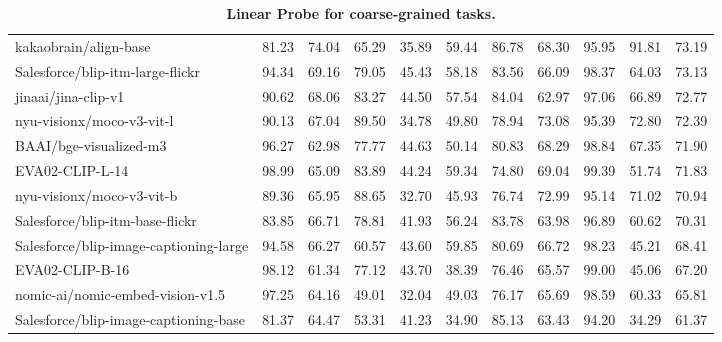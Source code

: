 \begin{table*}
{\begin{tabular}{lcccccccccc}
kakaobrain/align-base &81.23 &74.04 &65.29 &35.89 &59.44 &86.78 &68.30 &95.95 &91.81 &73.19 \\
Salesforce/blip-itm-large-flickr &94.34 &69.16 &79.05 &45.43 &58.18 &83.56 &66.09 &98.37 &64.03 &73.13 \\
jinaai/jina-clip-v1 &90.62 &68.06 &83.27 &44.50 &57.54 &84.04 &62.97 &97.06 &66.89 &72.77 \\
nyu-visionx/moco-v3-vit-l &90.13 &67.04 &89.50 &34.78 &49.80 &78.94 &73.08 &95.39 &72.80 &72.39 \\
BAAI/bge-visualized-m3 &96.27 &62.98 &77.77 &44.63 &50.14 &80.83 &68.29 &98.84 &67.35 &71.90 \\
EVA02-CLIP-L-14 &98.99 &65.09 &83.89 &44.24 &59.34 &74.80 &69.04 &99.39 &51.74 &71.83 \\
nyu-visionx/moco-v3-vit-b &89.36 &65.95 &88.65 &32.70 &45.93 &76.74 &72.99 &95.14 &71.02 &70.94 \\
Salesforce/blip-itm-base-flickr &83.85 &66.71 &78.81 &41.93 &56.24 &83.78 &63.98 &96.89 &60.62 &70.31 \\
Salesforce/blip-image-captioning-large &94.58 &66.27 &60.57 &43.60 &59.85 &80.69 &66.72 &98.23 &45.21 &68.41 \\
EVA02-CLIP-B-16 &98.12 &61.34 &77.12 &43.70 &38.39 &76.46 &65.57 &99.00 &45.06 &67.20 \\
nomic-ai/nomic-embed-vision-v1.5 &97.25 &64.16 &49.01 &32.04 &49.03 &76.17 &65.69 &98.59 &60.33 &65.81 \\
Salesforce/blip-image-captioning-base &81.37 &64.47 &53.31 &41.23 &34.90 &85.13 &63.43 &94.20 &34.29 &61.37 \\
\bottomrule
\end{tabular}}
\caption{\textbf{Linear Probe for coarse-grained tasks.}}\label{tab: linear probe: coarse}
\end{table*}